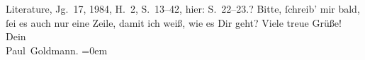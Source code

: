 \begin{ledgroupsized}[t]{13cm}
{{{{                        Literature}, Jg. 17, 1984, H. 2, S. 13–42,
                     hier: S. 22–23.}}}\label{K_L02877-3h}?\pend
           \pstart
           Bitte, ſchreib’ mir bald, ſei es auch nur eine Zeile, damit ich weiß, wie {\pb}es Dir geht?\pend
           \pstart
           Viele treue Grüße! {\\[\baselineskip]}Dein {\\[\baselineskip]}\spacefill\mbox{Paul Goldmann.}\pend
           \leftskip=0em{}
         
         \endnumbering{}\end{ledgroupsized}  \newcommand{\dateiname}{L02877}\newcommand{\titel}{Paul Goldmann an Arthur Schnitzler, 13. 6. 1899}\newcommand{\editorInnen}{Martin Anton Müller und Laura Untner}
      